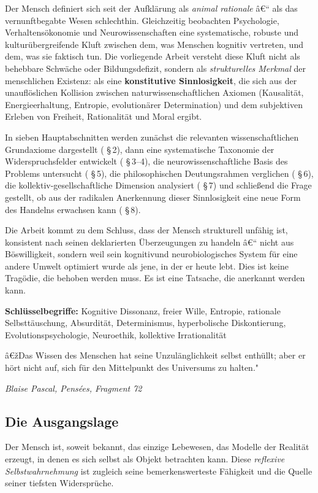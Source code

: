 ﻿\documentclass[12pt, a4paper]{article}
\begin{document}
Der Mensch definiert sich seit der Aufklärung als \textit{animal rationale} â€“
als das vernunftbegabte Wesen schlechthin. Gleichzeitig beobachten Psychologie,
Verhaltensökonomie und Neurowissenschaften eine systematische, robuste und
kulturübergreifende Kluft zwischen dem, was Menschen kognitiv vertreten, und
dem, was sie faktisch tun. Die vorliegende Arbeit versteht diese Kluft nicht als
behebbare Schwäche oder Bildungsdefizit, sondern als \emph{strukturelles Merkmal}
der menschlichen Existenz: als eine \textbf{konstitutive Sinnlosigkeit}, die sich
aus der unauflöslichen Kollision zwischen naturwissenschaftlichen Axiomen
(Kausalität, Energieerhaltung, Entropie, evolutionärer Determination) und dem
subjektiven Erleben von Freiheit, Rationalität und Moral ergibt.

In sieben Hauptabschnitten werden zunächst die relevanten wissenschaftlichen
Grundaxiome dargestellt ( §\,2), dann eine systematische Taxonomie der
Widerspruchsfelder entwickelt ( §\,3--4), die neurowissenschaftliche Basis des
Problems untersucht ( §\,5), die philosophischen Deutungsrahmen verglichen ( §\,6),
die kollektiv-gesellschaftliche Dimension analysiert ( §\,7) und schließend die
Frage gestellt, ob aus der radikalen Anerkennung dieser Sinnlosigkeit eine neue
Form des Handelns erwachsen kann ( §\,8).

Die Arbeit kommt zu dem Schluss, dass der Mensch strukturell unfähig ist, konsistent
nach seinen deklarierten Überzeugungen zu handeln â€“ nicht aus Böswilligkeit,
sondern weil sein kognitivund neurobiologisches System für eine andere Umwelt
optimiert wurde als jene, in der er heute lebt. Dies ist keine Tragödie, die
behoben werden muss. Es ist eine Tatsache, die anerkannt werden kann.

\bigskip
\textbf{Schlüsselbegriffe:} Kognitive Dissonanz, freier Wille, Entropie, rationale
Selbsttäuschung, Absurdität, Determinismus, hyperbolische Diskontierung,
Evolutionspsychologie, Neuroethik, kollektive Irrationalität

\epigraph{â€žDas Wissen des Menschen hat seine Unzulänglichkeit selbst enthüllt;
aber er hört nicht auf, sich für den Mittelpunkt des Universums zu halten."}%
{\textit{Blaise Pascal, Pensées, Fragment 72}}

\subsection{Die Ausgangslage}

Der Mensch ist, soweit bekannt, das einzige Lebewesen, das Modelle der Realität
erzeugt, in denen es sich selbst als Objekt betrachten kann. Diese \emph{reflexive
Selbstwahrnehmung} ist zugleich seine bemerkenswerteste Fähigkeit und die Quelle
seiner tiefsten Widersprüche.
\end{document}
